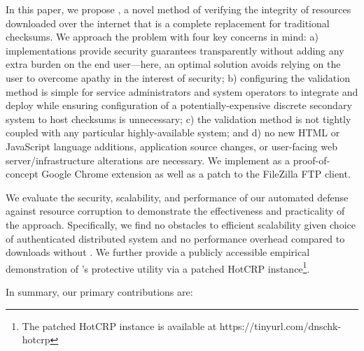 In this paper, we propose \SYSTEM{}, a novel method of verifying the integrity
of resources downloaded over the internet that is a complete replacement for
traditional checksums. We approach the problem with four key concerns in mind:
a) implementations provide security guarantees transparently without adding any
extra burden on the end user---here, an optimal solution avoids relying on the
user to overcome apathy in the interest of security; b) configuring the
validation method is simple for service administrators and system operators to
integrate and deploy while ensuring configuration of a potentially-expensive
discrete secondary system to host checksums is unnecessary; c) the validation
method is not tightly coupled with any particular highly-available system; and
d) no new HTML or JavaScript language additions, application source changes, or
user-facing web server/infrastructure alterations are necessary. We implement
\SYSTEM{} as a proof-of-concept Google Chrome extension as well as a patch to
the FileZilla FTP client.

We evaluate the security, scalability, and performance of our automated defense
against resource corruption to demonstrate the effectiveness and
practicality of the \SYSTEM{} approach. Specifically, we find no obstacles to
efficient scalability given choice of authenticated distributed system and no
performance overhead compared to downloads without \SYSTEM{}. We further provide
a publicly accessible empirical demonstration of \SYSTEM{}'s protective utility
via a patched HotCRP instance\footnote{The patched HotCRP instance is available
at https://tinyurl.com/dnschk-hotcrp}.

In summary, our primary contributions are:

